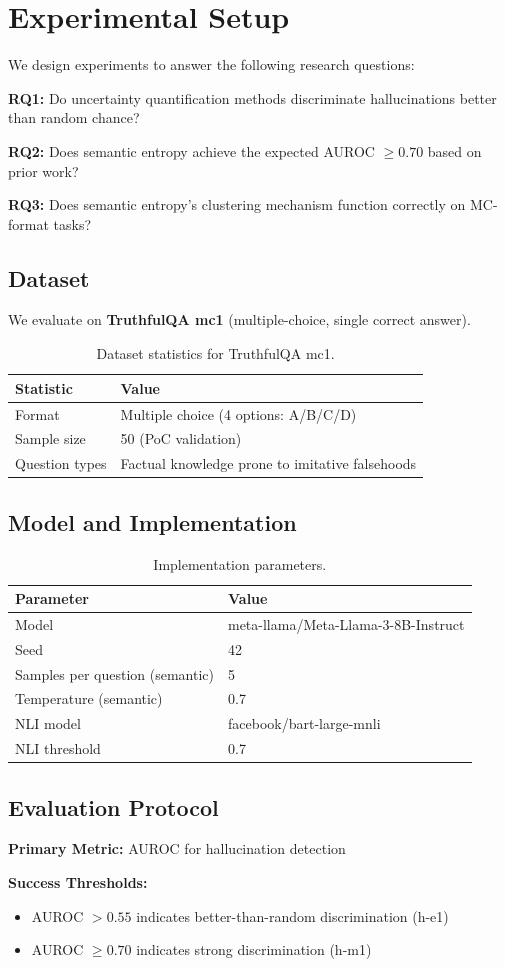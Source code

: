 \section{Experimental Setup}
\label{sec:experiments}

We design experiments to answer the following research questions:

\textbf{RQ1:} Do uncertainty quantification methods discriminate hallucinations better than random chance?

\textbf{RQ2:} Does semantic entropy achieve the expected AUROC $\geq 0.70$ based on prior work?

\textbf{RQ3:} Does semantic entropy's clustering mechanism function correctly on MC-format tasks?

\subsection{Dataset}

We evaluate on \textbf{TruthfulQA mc1} (multiple-choice, single correct answer).

\begin{table}[h]
\centering
\begin{tabular}{ll}
\toprule
\textbf{Statistic} & \textbf{Value} \\
\midrule
Format & Multiple choice (4 options: A/B/C/D) \\
Sample size & 50 (PoC validation) \\
Question types & Factual knowledge prone to imitative falsehoods \\
\bottomrule
\end{tabular}
\caption{Dataset statistics for TruthfulQA mc1.}
\label{tab:dataset}
\end{table}

\subsection{Model and Implementation}

\begin{table}[h]
\centering
\begin{tabular}{ll}
\toprule
\textbf{Parameter} & \textbf{Value} \\
\midrule
Model & meta-llama/Meta-Llama-3-8B-Instruct \\
Seed & 42 \\
Samples per question (semantic) & 5 \\
Temperature (semantic) & 0.7 \\
NLI model & facebook/bart-large-mnli \\
NLI threshold & 0.7 \\
\bottomrule
\end{tabular}
\caption{Implementation parameters.}
\label{tab:params}
\end{table}

\subsection{Evaluation Protocol}

\textbf{Primary Metric:} AUROC for hallucination detection

\textbf{Success Thresholds:}
\begin{itemize}
    \item AUROC $> 0.55$ indicates better-than-random discrimination (h-e1)
    \item AUROC $\geq 0.70$ indicates strong discrimination (h-m1)
\end{itemize}
